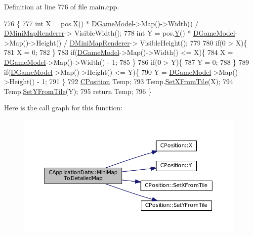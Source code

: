 Definition at line 776 of file main.\+cpp.


\begin{DoxyCode}
776                                                                     \{
777     \textcolor{keywordtype}{int} X = pos.\hyperlink{classCPosition_a9a6b94d3b91df1492d166d9964c865fc}{X}() * \hyperlink{classCApplicationData_a32b50c7c1cbac3cfd67c7f775b1d6fee}{DGameModel}->Map()->Width() / \hyperlink{classCApplicationData_a59b0f5dfe30ed5a54dd28aee98109e34}{DMiniMapRenderer}->
      VisibleWidth();
778     \textcolor{keywordtype}{int} Y = pos.\hyperlink{classCPosition_a1aa8a30e2f08dda1f797736ba8c13a87}{Y}() * \hyperlink{classCApplicationData_a32b50c7c1cbac3cfd67c7f775b1d6fee}{DGameModel}->Map()->Height() / \hyperlink{classCApplicationData_a59b0f5dfe30ed5a54dd28aee98109e34}{DMiniMapRenderer}->
      VisibleHeight();
779     
780     \textcolor{keywordflow}{if}(0 > X)\{
781         X = 0;    
782     \}
783     \textcolor{keywordflow}{if}(\hyperlink{classCApplicationData_a32b50c7c1cbac3cfd67c7f775b1d6fee}{DGameModel}->Map()->Width() <= X)\{
784         X = \hyperlink{classCApplicationData_a32b50c7c1cbac3cfd67c7f775b1d6fee}{DGameModel}->Map()->Width() - 1;   
785     \}
786     \textcolor{keywordflow}{if}(0 > Y)\{
787         Y = 0;    
788     \}
789     \textcolor{keywordflow}{if}(\hyperlink{classCApplicationData_a32b50c7c1cbac3cfd67c7f775b1d6fee}{DGameModel}->Map()->Height() <= Y)\{
790         Y = \hyperlink{classCApplicationData_a32b50c7c1cbac3cfd67c7f775b1d6fee}{DGameModel}->Map()->Height() - 1;   
791     \}
792     \hyperlink{classCPosition}{CPosition} Temp;
793     Temp.\hyperlink{classCPosition_ac6a1eeaeb98e20942efea7cf253b2ec4}{SetXFromTile}(X);
794     Temp.\hyperlink{classCPosition_a4be1caa5ce58297e9d371f6bc1db32d9}{SetYFromTile}(Y);
795     \textcolor{keywordflow}{return} Temp;
796 \}
\end{DoxyCode}
Here is the call graph for this function\+:
\nopagebreak
\begin{figure}[H]
\begin{center}
\leavevmode
\includegraphics[width=350pt]{classCApplicationData_a3dabde94ddec0eb2c732525f54164bc5_cgraph}
\end{center}
\end{figure}
